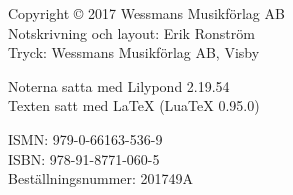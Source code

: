 \pagestyle{empty}
\tinyskip
\vfill
\begin{flushleft}
\small{
Copyright \copyright{} 2017 Wessmans Musikförlag AB \\
Notskrivning och layout: Erik Ronström \\
Tryck: Wessmans Musikförlag AB, Visby

\vspace{3mm}

Noterna satta med Lilypond 2.19.54 \\
Texten satt med \LaTeX{} (LuaTeX 0.95.0)

\vspace{3mm}

ISMN: 979-0-66163-536-9 \\
ISBN: 978-91-8771-060-5 \\
Beställningsnummer: 201749A
}
\end{flushleft}

